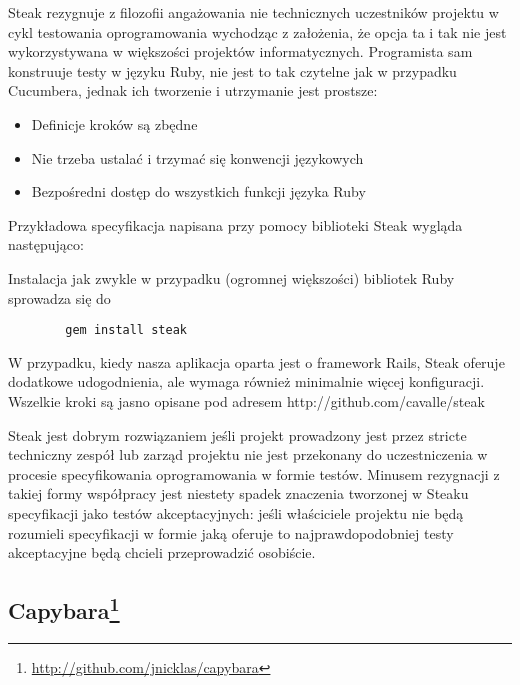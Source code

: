       Steak rezygnuje z filozofii angażowania nie technicznych uczestników projektu w cykl testowania oprogramowania wychodząc z założenia, że opcja ta i tak nie jest wykorzystywana w większości projektów informatycznych. Programista sam konstruuje testy w języku Ruby, nie jest to tak czytelne jak w przypadku Cucumbera, jednak ich tworzenie i utrzymanie jest prostsze:
      
      \begin{itemize}
        \item Definicje kroków są zbędne
        \item Nie trzeba ustalać i trzymać się konwencji językowych
        \item Bezpośredni dostęp do wszystkich funkcji języka Ruby
      \end{itemize}
      
      Przykładowa specyfikacja napisana przy pomocy biblioteki Steak wygląda następująco:
      
      
      
      Instalacja jak zwykle w przypadku (ogromnej większości) bibliotek Ruby sprowadza się do
      
      \begin{lstlisting}
        gem install steak
      \end{lstlisting}
      
      W przypadku, kiedy nasza aplikacja oparta jest o framework Rails, Steak oferuje dodatkowe udogodnienia, ale wymaga również minimalnie więcej konfiguracji. Wszelkie kroki są jasno opisane pod adresem http://github.com/cavalle/steak
      
      Steak jest dobrym rozwiązaniem jeśli projekt prowadzony jest przez stricte techniczny zespół lub zarząd projektu nie jest przekonany do uczestniczenia w procesie specyfikowania oprogramowania w formie testów. Minusem rezygnacji z takiej formy współpracy jest niestety spadek znaczenia tworzonej w Steaku specyfikacji jako testów akceptacyjnych: jeśli właściciele projektu nie będą rozumieli specyfikacji w formie jaką oferuje to najprawdopodobniej testy akceptacyjne będą chcieli przeprowadzić osobiście.
    
    \subsection[Capybara]{Capybara\footnote{\url{http://github.com/jnicklas/capybara}}}  

